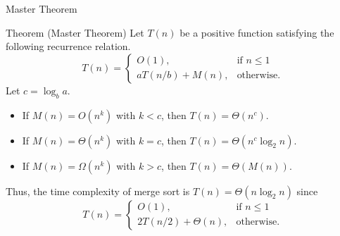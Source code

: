 \documentclass{beamer}
\begin{document}
\begin{frame}{Master Theorem}
  \begin{block}{Theorem (Master Theorem)}
    \pause
    \small
    Let $T(n)$ be a positive function satisfying the following recurrence
    relation.
    \begin{equation*}
      T(n) =
      \begin{cases}
        O(1), & \text{if $n \leq 1$} \\
        aT(n / b) + M(n), & \text{otherwise}.
      \end{cases}
    \end{equation*}
    Let $c = \log_b a$.
    \begin{itemize}
      \item If $M(n) = O(n^k)$ with $k < c$, then $T(n) = \Theta(n^c)$. \pause
      \item If $M(n) = \Theta(n^k)$ with $k = c$,
      then $T(n) = \Theta(n^c \log_2 n)$. \pause
      \item If $M(n) = \Omega(n^k)$ with $k > c$, then $T(n) = \Theta(M(n))$.
      \pause
    \end{itemize}
  \end{block}
  Thus, the time complexity of merge sort is $T(n) = \Theta(n \log_2 n)$ since
  \begin{equation*}
    T(n) =
    \begin{cases}
      O(1), & \text{if $n \leq 1$} \\
      2T(n / 2) + \Theta(n), & \text{otherwise}.
    \end{cases}
  \end{equation*}
\end{frame}
\end{document}
